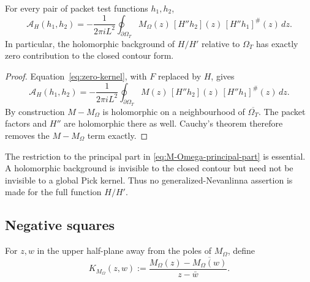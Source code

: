 \begin{proposition}
\label{prop:principal-part-reduction}
For every pair of packet test functions $h_1,h_2$,
\begin{equation}
\boxed{
\mathcal A_H(h_1,h_2)
=
-\frac{1}{2\pi iL^2}
\oint_{\partial\Omega_T}
M_{\Omega}(z)
\,[H''h_2](z)\,[H''h_1]^\#(z)\,dz.
}
\label{eq:principal-part-contour}
\end{equation}
In particular, the holomorphic background of $H/H'$ relative to
$\Omega_T$ has exactly zero contribution to the closed contour form.
\end{proposition}

\begin{proof}
Equation~\eqref{eq:zero-kernel}, with $F$ replaced by $H$, gives
\[
\mathcal A_H(h_1,h_2)
=
-\frac{1}{2\pi iL^2}
\oint_{\partial\Omega_T}
M(z)
\,[H''h_2](z)\,[H''h_1]^\#(z)\,dz.
\]
By construction $M-M_\Omega$ is holomorphic on a neighbourhood of
$\overline{\Omega_T}$.  The packet factors and $H''$ are holomorphic there as
well.  Cauchy's theorem therefore removes the $M-M_\Omega$ term exactly.
\end{proof}

The restriction to the principal part in
\eqref{eq:M-Omega-principal-part} is essential.  A holomorphic background is
invisible to the closed contour but need not be invisible to a global Pick
kernel.  Thus no generalized-Nevanlinna assertion is made for the full
function $H/H'$.

\subsection{Negative squares}

For $z,w$ in the upper half-plane away from the poles of $M_\Omega$, define
\begin{equation}
K_{M_\Omega}(z,w)
:=
\frac{M_\Omega(z)-\overline{M_\Omega(w)}}{z-\bar w}.
\label{eq:MOmega-Nevanlinna-kernel}
\end{equation}

